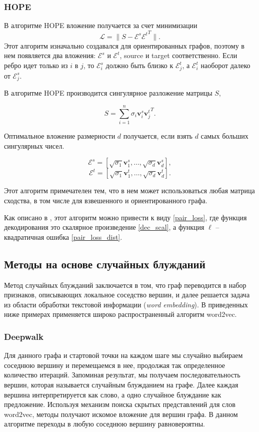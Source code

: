 \documentclass[12pt,a4paper]{extarticle}
\newcommand{\E}{\mathcal{E}}
\newcommand{\Loss}{\mathcal{L}}
\begin{document}
    
    \subsubsection{HOPE \cite{HOPE}}
    
    В алгоритме HOPE вложение получается за счет минимизации
    \[
    \Loss = \lVert S - \E^s {\E^t}^T \rVert.
    \]
    Этот алгоритм изначально создавался для ориентированных графов, поэтому в нем появляется два вложения: $\E^s$ и $\E^t$, source и target соответственно. Если ребро идет только из $i$ в $j$, то $\E^s_i$ должно быть близко к $\E^t_j$, а $\E^t_i$ наоборот далеко от $\E^s_j$.
    
    В алгоритме HOPE производится сингулярное разложение матрицы $S$,
    
    \[
    S = \sum_{i=1}^{n} \sigma_i \mathbf{v}_i^s {\mathbf{v}_j^t}^T.
    \]
    
    Оптимальное вложение размерности $d$ получается, если взять $d$ самых больших сингулярных чисел.
    
    \[
    \E^s = [ \sqrt{\sigma_1} \mathbf{v}_1^s, \ldots, \sqrt{\sigma_d} \mathbf{v}_d^s],
    \]
    \[
    \E^t = [ \sqrt{\sigma_1} \mathbf{v}_1^t, \ldots, \sqrt{\sigma_d} \mathbf{v}_d^t].
    \]
    
    Этот алгоритм примечателен тем, что в нем может использоваться любая матрица сходства, в том числе для взвешенного и ориентированного графа.
    
    Как описано в \cite{survey2}, этот алгоритм можно привести к виду \eqref{pair_loss}, где функция декодирования это скалярное произведение \eqref{dec_scal}, а функция $\ell$ -- квадратичная ошибка \eqref{pair_loss_dist}.
    
    \subsection{Методы на основе случайных блужданий}
    Метод случайных блужданий заключается в том, что граф переводится в набор признаков, описывающих локальное соседство вершин, и далее решается задача из области обработки текстовой информации (\textit{word embedding}). В приведенных ниже примерах применяется широко распространенный алгоритм word2vec.
    
    \subsubsection{Deepwalk \cite{deepwalk}}
    Для данного графа и стартовой точки на каждом шаге мы случайно выбираем соседнюю вершину и перемещаемся в нее, продолжая так определенное количество итераций.
    Запоминая результат, мы получаем последовательность вершин, которая называется случайным блужданием на графе.
    Далее каждая вершина интерпретируется как слово, а одно случайное блуждание как предложение.
    Используя механизм поиска скрытых представлений для слов word2vec, методы получают искомое вложение для вершин графа.
    В данном алгоритме переходы в любую соседнюю вершину равновероятны.
    
\end{document}
